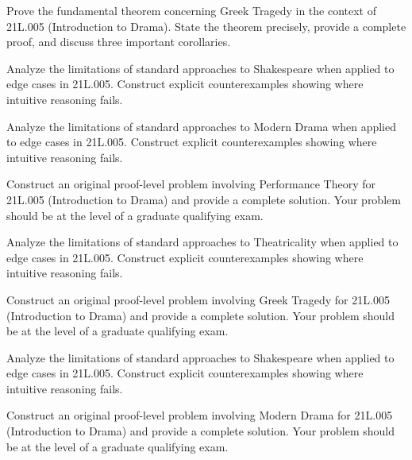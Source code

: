 \documentclass[12pt,a4paper]{exam}
\begin{document}
\begin{questions}

\question[3]
Prove the fundamental theorem concerning Greek Tragedy in the context of 21L.005 (Introduction to Drama). State the theorem precisely, provide a complete proof, and discuss three important corollaries.

\vspace{0.3cm}

\question[3]
Analyze the limitations of standard approaches to Shakespeare when applied to edge cases in 21L.005. Construct explicit counterexamples showing where intuitive reasoning fails.

\vspace{0.3cm}

\question[3]
Analyze the limitations of standard approaches to Modern Drama when applied to edge cases in 21L.005. Construct explicit counterexamples showing where intuitive reasoning fails.

\vspace{0.3cm}

\question[4]
Construct an original proof-level problem involving Performance Theory for 21L.005 (Introduction to Drama) and provide a complete solution. Your problem should be at the level of a graduate qualifying exam.

\vspace{0.3cm}

\question[6]
Analyze the limitations of standard approaches to Theatricality when applied to edge cases in 21L.005. Construct explicit counterexamples showing where intuitive reasoning fails.

\vspace{0.3cm}

\question[5]
Construct an original proof-level problem involving Greek Tragedy for 21L.005 (Introduction to Drama) and provide a complete solution. Your problem should be at the level of a graduate qualifying exam.

\vspace{0.3cm}

\question[3]
Analyze the limitations of standard approaches to Shakespeare when applied to edge cases in 21L.005. Construct explicit counterexamples showing where intuitive reasoning fails.

\vspace{0.3cm}

\question[4]
Construct an original proof-level problem involving Modern Drama for 21L.005 (Introduction to Drama) and provide a complete solution. Your problem should be at the level of a graduate qualifying exam.


\end{questions}
\end{document}
